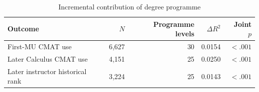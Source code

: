 \begin{landscape}
\begin{table}[p]
\centering
\small
\caption{Incremental contribution of degree programme}
\label{tab:degree}
\begin{tabular}{@{}lrrrr@{}}
\toprule
Outcome & $N$ & Programme levels & $\Delta R^2$ & Joint $p$ \\
\midrule
First-MU CMAT use & 6,627 & 30 & 0.0154 & $<.001$ \\
Later Calculus CMAT use & 4,151 & 25 & 0.0250 & $<.001$ \\
Later instructor historical rank & 3,224 & 25 & 0.0143 & $<.001$ \\
\bottomrule
\end{tabular}
\end{table}
\end{landscape}



